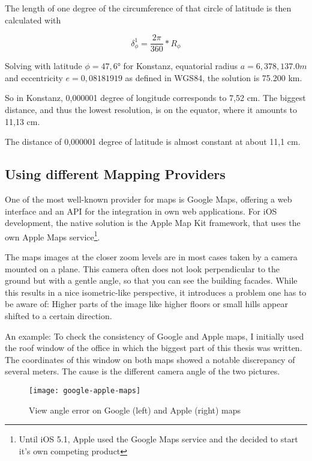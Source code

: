 The length of one degree of the circumference of that circle of latitude is then calculated with

\[\delta_{\phi}^{1} = \frac{2\pi}{360} * R_{\phi}\]

Solving with latitude \(\phi = 47,6°\) for Konstanz, equatorial radius \(a = 6,378,137.0 m\) and eccentricity \(e = 0,08181919\) as defined in WGS84, the solution is 75.200 km.

So in Konstanz, 0,000001 degree of longitude corresponds to 7,52 cm. The biggest distance, and thus the lowest resolution, is on the equator, where it amounts to 11,13 cm.

The distance of 0,000001 degree of latitude is almost constant at about 11,1 cm. %

\subsection{Using different Mapping Providers}

One of the most well-known provider for maps is Google Maps, offering a web interface and an API for the integration in own web applications. For iOS development, the native solution is the Apple Map Kit framework, that uses the own Apple Maps service\footnote{Until iOS 5.1, Apple used the Google Maps service and the decided to start it's own competing product}.

The maps images at the closer zoom levels are in most cases taken by a camera mounted on a plane. This camera often does not look perpendicular to the ground but with a gentle angle, so that you can see the building facades. %
While this results in a nice isometric-like perspective, it introduces a problem one has to be aware of: Higher parts of the image like higher floors or small hills appear shifted to a certain direction. 

An example: To check the consistency of Google and Apple maps, I initially used the roof window of the office in which the biggest part of this thesis was written. The coordinates of this window on both maps showed a notable discrepancy of several meters. The cause is the different camera angle of the two pictures. 

\begin{figure}[H]
\centering
\texttt{[image: google-apple-maps]}
\caption{View angle error on Google (left) and Apple (right) maps}
\end{figure}

